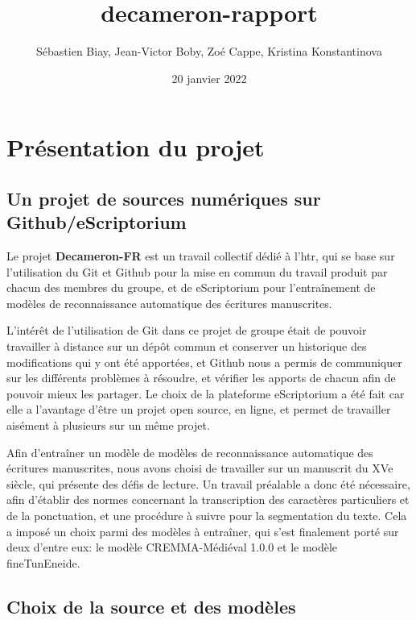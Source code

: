 \documentclass{article}
\title{decameron-rapport}
\author{Sébastien Biay, Jean-Victor Boby, Zoé Cappe, Kristina Konstantinova}
\date{20 janvier 2022}
\begin{document}
	
	\maketitle
	
	\section{Présentation du projet}
	\subsection{Un projet de sources numériques sur Github/eScriptorium}
	Le projet \textbf{Decameron-FR} est un travail collectif dédié à l'\gls{htr}, qui se base sur l’utilisation du Git et Github pour la mise en commun du travail produit par chacun des membres du groupe, et de eScriptorium pour l’entraînement de modèles de reconnaissance automatique des écritures manuscrites. 
	
	L’intérêt de l’utilisation de Git dans ce projet de groupe était de pouvoir travailler à distance sur un dépôt commun et conserver un historique des modifications qui y ont été apportées, et Github nous a permis de communiquer sur les différents problèmes à résoudre, et vérifier les apports de chacun afin de pouvoir mieux les partager. Le choix de la plateforme eScriptorium a été fait car elle a l’avantage d’être un projet open source, en ligne, et permet de travailler aisément à plusieurs sur un même projet.
	
	Afin d’entraîner un modèle de modèles de reconnaissance automatique des écritures manuscrites, nous avons choisi de travailler sur un manuscrit du XVe siècle, qui présente des défis de lecture. Un travail préalable a donc été nécessaire, afin d’établir des normes concernant la transcription des caractères particuliers et de la ponctuation, et une procédure à suivre pour la segmentation du texte. Cela a imposé un choix parmi des modèles à entraîner, qui  s’est finalement porté sur deux d’entre eux: le modèle CREMMA-Médiéval 1.0.0 et le modèle fineTunEneide.
	
	\subsection{Choix de la source et des modèles}
	
\end{document}
